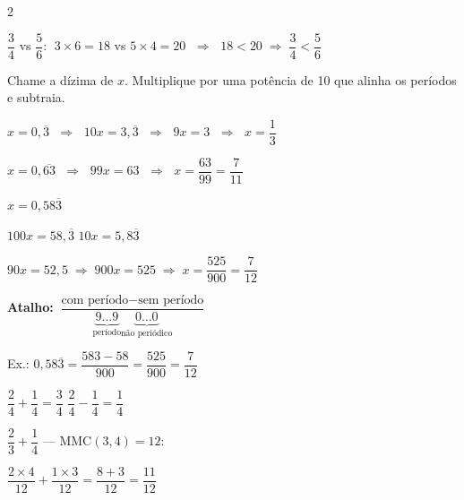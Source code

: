 \documentclass[12pt,twoside]{article}
\begin{document}
\begin{multicols}{2}


$\dfrac{3}{4}$ vs $\dfrac{5}{6}$: $\;3\times6=18$ vs $5\times4=20$ $\;\Rightarrow\;$ $18 < 20 \;\Rightarrow\; \dfrac{3}{4} < \dfrac{5}{6}$ \checkmark


Chame a dízima de $x$. Multiplique por uma potência de 10 que alinha os períodos e subtraia.


$x = 0{,}\overline{3}$ $\;\Rightarrow\;$ $10x = 3{,}\overline{3}$ $\;\Rightarrow\;$ $9x = 3$ $\;\Rightarrow\;$ $x = \dfrac{1}{3}$ \checkmark

$x = 0{,}\overline{63}$ $\;\Rightarrow\;$ $99x = 63$ $\;\Rightarrow\;$ $x = \dfrac{63}{99} = \dfrac{7}{11}$ \checkmark


$x = 0{,}58\overline{3}$

$100x = 58{,}\overline{3}$ \quad $10x = 5{,}8\overline{3}$

$90x = 52{,}5 \;\Rightarrow\; 900x = 525 \;\Rightarrow\; x = \dfrac{525}{900} = \dfrac{7}{12}$ \checkmark

\textbf{Atalho:} $\dfrac{\text{com período} - \text{sem período}}{\underbrace{9\ldots9}_{\text{período}}\underbrace{0\ldots0}_{\text{não periódico}}}$

Ex.: $0{,}58\overline{3} = \dfrac{583-58}{900} = \dfrac{525}{900} = \dfrac{7}{12}$




$\dfrac{2}{4} + \dfrac{1}{4} = \dfrac{3}{4}$ \qquad $\dfrac{2}{4} - \dfrac{1}{4} = \dfrac{1}{4}$


$\dfrac{2}{3} + \dfrac{1}{4}$ — MMC$(3,4) = 12$:

$\dfrac{2\times4}{12} + \dfrac{1\times3}{12} = \dfrac{8+3}{12} = \dfrac{11}{12}$ \checkmark





\end{multicols}
\end{document}
